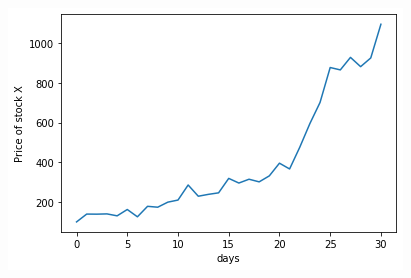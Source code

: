 \begin{figure}[htbp]
\begin{center}
  \includegraphics[width=0.7\linewidth]{figures/lesson6_solutions_5_0.png}
\end{center}
\end{figure}